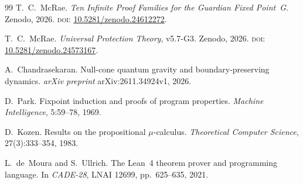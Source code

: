 \begin{thebibliography}{99}
T.~C.~McRae.
\emph{Ten Infinite Proof Families for the Guardian Fixed Point~G}.
Zenodo, 2026.
\textsc{doi:} \href{https://doi.org/10.5281/zenodo.24612272}{10.5281/zenodo.24612272}.

T.~C.~McRae.
\emph{Universal Protection Theory}, v5.7-G3.
Zenodo, 2026.
\textsc{doi:} \href{https://doi.org/10.5281/zenodo.24573167}{10.5281/zenodo.24573167}.

A.~Chandrasekaran.
Null-cone quantum gravity and boundary-preserving dynamics.
\emph{arXiv preprint} arXiv:2611.34924v1, 2026.

D.~Park.
Fixpoint induction and proofs of program properties.
\emph{Machine Intelligence}, 5:59--78, 1969.

D.~Kozen.
Results on the propositional $\mu$-calculus.
\emph{Theoretical Computer Science}, 27(3):333--354, 1983.

L.~de~Moura and S.~Ullrich.
The Lean~4 theorem prover and programming language.
In \emph{CADE-28}, LNAI 12699, pp.~625--635, 2021.
\end{thebibliography}


